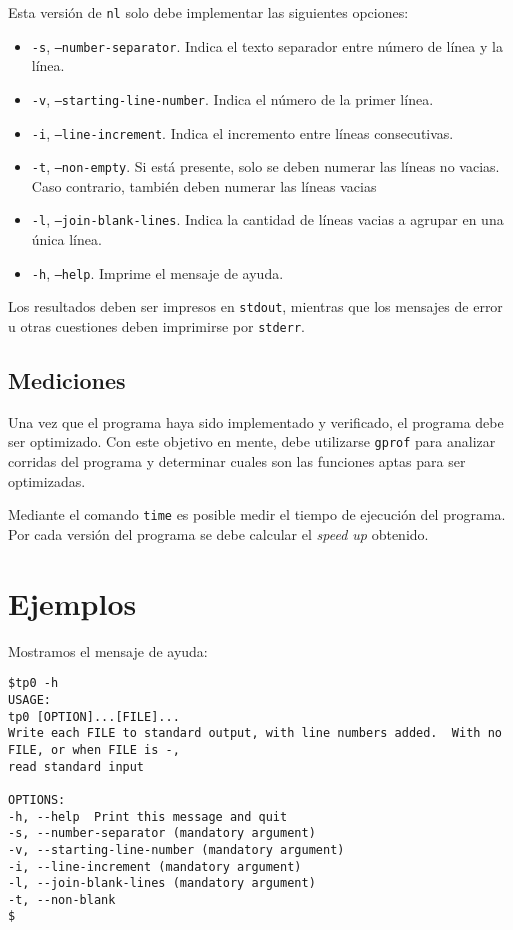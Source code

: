 \documentclass[9pt,a4paper]{article}
\newcommand{\stdout}{\texttt{stdout}}
\newcommand{\stderr}{\texttt{stderr}}
\newcommand{\gprof}{\texttt{gprof}}
\newcommand{\nl}{\texttt{nl}}
\newcommand{\unixtime}{\texttt{time}}
\begin{document}
Esta versión de \nl{} solo debe implementar las siguientes opciones:
\begin{itemize}
\item \texttt{-s}, \texttt{--number-separator}. Indica el texto separador entre número de línea y la línea.
\item \texttt{-v}, \texttt{--starting-line-number}. Indica el número de la primer línea.
\item \texttt{-i}, \texttt{--line-increment}. Indica el incremento entre líneas consecutivas.
\item \texttt{-t}, \texttt{--non-empty}. Si está presente, solo se deben numerar las líneas no vacias. Caso contrario,
también deben numerar las líneas vacias 
\item \texttt{-l}, \texttt{--join-blank-lines}. Indica la cantidad de líneas vacias a agrupar en una única línea.
\item \texttt{-h}, \texttt{--help}. Imprime el mensaje de ayuda.
\end{itemize}

Los resultados deben ser impresos en \stdout{}, mientras que los mensajes de error u otras cuestiones deben imprimirse por \stderr{}.

\subsection{Mediciones}
Una vez que el programa haya sido implementado y verificado, el programa debe ser optimizado. Con este objetivo en mente, debe
utilizarse \gprof{} para analizar corridas del programa y determinar cuales son las funciones aptas para ser optimizadas.

Mediante el comando \unixtime\cite{TIME} es posible medir el tiempo de ejecución del programa. Por cada versión del programa
se debe calcular el \textit{speed up} obtenido.

\section{Ejemplos}

\noindent
Mostramos el mensaje de ayuda:
\begin{small}
\begin{verbatim}
$tp0 -h
USAGE:
tp0 [OPTION]...[FILE]...
Write each FILE to standard output, with line numbers added.  With no FILE, or when FILE is -,
read standard input

OPTIONS:
-h, --help	Print this message and quit
-s, --number-separator (mandatory argument)
-v, --starting-line-number (mandatory argument)
-i, --line-increment (mandatory argument)
-l, --join-blank-lines (mandatory argument)
-t, --non-blank
$
\end{verbatim}
\end{small}
\end{document}

